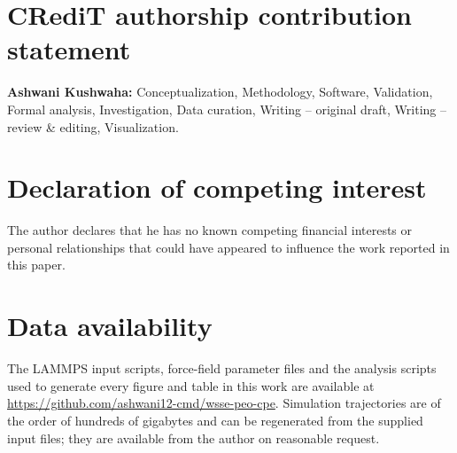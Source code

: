 
\section*{CRediT authorship contribution statement}
\textbf{Ashwani Kushwaha:} Conceptualization, Methodology, Software,
Validation, Formal analysis, Investigation, Data curation,
Writing -- original draft, Writing -- review \& editing, Visualization.

\section*{Declaration of competing interest}
The author declares that he has no known competing financial interests or
personal relationships that could have appeared to influence the work
reported in this paper.

\section*{Data availability}
The LAMMPS input scripts, force-field parameter files and the analysis
scripts used to generate every figure and table in this work are available
at \url{https://github.com/ashwani12-cmd/wsse-peo-cpe}. Simulation
trajectories are of the order of hundreds of gigabytes and can be
regenerated from the supplied input files; they are available from the
author on reasonable request.
